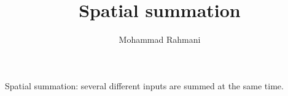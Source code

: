 \documentclass[a4paper]{article}
\title{Spatial summation}
\date{}
\author{Mohammad Rahmani}
\begin{document}
    \maketitle
    Spatial summation: several different inputs are summed at the same time.
    
    
\end{document}
